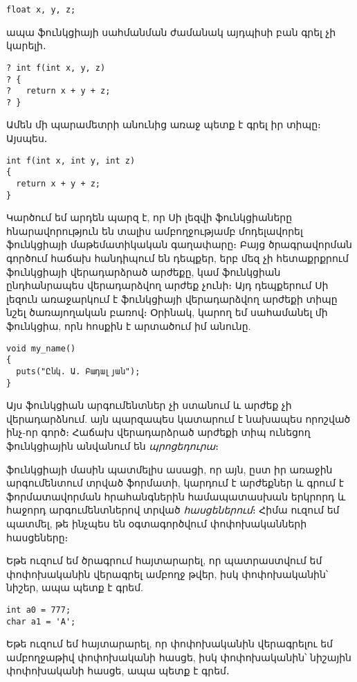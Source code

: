 \begin{Verbatim}
float x, y, z;
\end{Verbatim}

ապա ֆունկցիայի սահմանման ժամանակ այդպիսի բան գրել չի կարելի․

\begin{Verbatim}
? int f(int x, y, z)
? {
?   return x + y + z;
? }
\end{Verbatim}

Ամեն մի պարամետրի անունից առաջ պետք է գրել իր տիպը։ Այսպես․

\begin{Verbatim}
int f(int x, int y, int z)
{
  return x + y + z;
}
\end{Verbatim}

Կարծում եմ արդեն պարզ է, որ Սի լեզվի ֆունկցիաները հնարավորություն են տալիս
ամբողջությամբ մոդելավորել ֆունկցիայի մաթեմատիկական գաղափարը։ Բայց ծրագրավորման
գործում հաճախ հանդիպում են դեպքեր, երբ մեզ չի հետաքրքրում ֆունկցիայի
վերադարձրած արժեքը, կամ ֆունկցիան ընդհանրապես վերադարձվող արժեք չունի։ Այդ
դեպքերում Սի լեզուն առաջարկում է ֆունկցիայի վերադարձվող արժեքի տիպը նշել
 ծառայողական բառով։ Օրինակ, կարող եմ սահամանել մի
ֆունկցիա, որն  հոսքին է արտածում իմ անունը.

\begin{Verbatim}
void my_name()
{
  puts("Ընկ. Ա. Բադալյան");
}
\end{Verbatim}

Այս ֆունկցիան արգումենտներ չի ստանում և արժեք չի վերադարձնում. այն
պարզապես կատարում է նախապես որոշված ինչ-որ գործ։ Հաճախ 
վերադարձրած արժեքի տիպ ունեցող ֆունկցիային անվանում են
\emph{պրոցեդուրա}։

 ֆունկցիայի մասին պատմելիս ասացի, որ այն,
ըստ իր առաջին արգումենտում տրված ֆորմատի, կարդում է արժեքներ և գրում
է ֆորմատավորման հրահանգներին համապատասխան երկրորդ և հաջորդ արգումենտներով
տրված \emph{հասցեներում}։ Հիմա ուզում եմ պատմել,
թե ինչպես են օգտագործվում փոփոխականների հասցեները։

Եթե ուզում եմ ծրագրում հայտարարել, որ պատրաստվում եմ  փոփոխականին
վերագրել ամբողջ թվեր, իսկ  փոփոխականին՝ նիշեր, ապա պետք է գրեմ.

\begin{Verbatim}
int a0 = 777;
char a1 = 'A';
\end{Verbatim}

Եթե ուզում եմ հայտարարել, որ  փոփոխականին վերագրելու եմ ամբողջաթիվ
փոփոխականի հասցե, իսկ  փոփոխականին՝ նիշային փոփոխականի հասցե,
ապա պետք է գրեմ․

